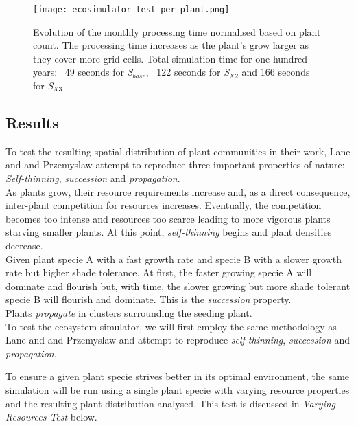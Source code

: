 \begin{figure}
\center
	\texttt{[image: ecosimulator\_test\_per\_plant.png]}
	\caption{ Evolution of the monthly processing time normalised based on plant count. The processing time increases as the plant's grow larger as they cover more grid cells. Total simulation time for one hundred years: ~49 seconds for \textit{S$_{base}$}, ~122 seconds for \textit{S$_{X2}$} and 166 seconds for \textit{S$_{X3}$}}
	\label{fig:ecosimulator_test_per_plant}
\end{figure}

\subsection{Results}

To test the resulting spatial distribution of plant communities in their work, Lane and and Przemyslaw \cite{Lane2002} attempt to reproduce three important properties of nature: \textit{Self-thinning}, \textit{succession} and \textit{propagation}.\\
As plants grow, their resource requirements increase and, as a direct consequence, inter-plant competition for resources increases. Eventually, the competition becomes too intense and resources too scarce leading to more vigorous plants starving smaller plants. At this point, \textit{self-thinning} begins and plant densities decrease.\\
Given plant specie A with a fast growth rate and specie B with a slower growth rate but higher shade tolerance. At first, the faster growing specie A will dominate and flourish but, with time, the slower growing but more shade tolerant specie B will flourish and dominate. This is the \textit{succession} property.\\
Plants \textit{propagate} in clusters surrounding the seeding plant.\\

To test the ecosystem simulator, we will first employ the same methodology as Lane and and Przemyslaw \cite{Lane2002} and attempt to reproduce \textit{self-thinning}, \textit{succession} and \textit{propagation}.

To ensure a given plant specie strives better in its optimal environment, the same simulation will be run using a single plant specie with varying resource properties and the resulting plant distribution analysed. This test is discussed in \textit{Varying Resources Test} below.\\

